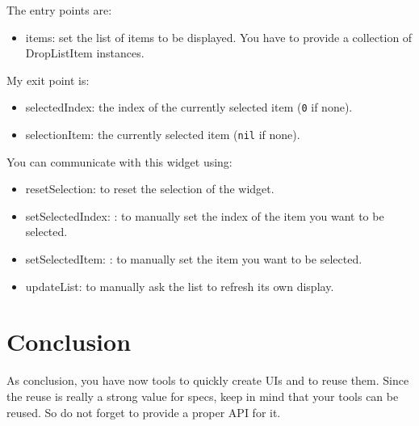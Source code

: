 \documentclass[a4paper,10pt,twoside]{book}
\begin{document}
The entry points are:
\begin{itemize}
	\item items: set the list of items to be displayed. You have to provide a collection of DropListItem instances.
\end{itemize}
My exit point is:
\begin{itemize}
	\item selectedIndex: the index of the currently selected item (\verb+0+ if none).
	\item selectionItem: the currently selected item (\verb+nil+ if none).
\end{itemize}
You can communicate with this widget using:
\begin{itemize}
\item resetSelection: to reset the selection of the widget.
\item setSelectedIndex: : to manually set the index of the item you want to be selected.
\item setSelectedItem: : to manually set the item you want to be selected. 
\item updateList: to manually ask the list to refresh its own display.
\end{itemize}




\section{Conclusion}
As conclusion, you have now tools to quickly create UIs and to reuse them. Since the reuse is really a strong value for specs, keep in mind that your tools can be reused. So do not forget to provide a proper API for it.

\ifx\wholebook\relax\else
   
   
\end{document}

